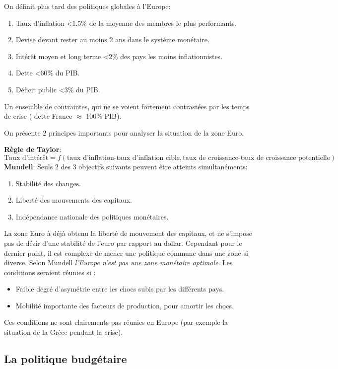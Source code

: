 On définit plus tard des politiques globales à l'Europe: 
\begin{enumerate}
	\item Taux d'inflation <1.5$\%$ de la moyenne des membres le plus performants.
	\item Devise devant rester au moins 2 ans dans le système monétaire.
	\item Intérêt moyen et long terme <$2\%$ des pays les moins inflationnistes.
	\item Dette <$60\%$ du PIB.
	\item Déficit public <$3\%$ du PIB.
	
\end{enumerate}

Un ensemble de contraintes, qui ne se voient fortement contrastées par les temps de crise ( dette France $\approx$ 100$\%$ PIB).

On présente 2 principes importants pour analyser la situation de la zone Euro. 

\textbf{Règle de Taylor}: 	\[
	\text{Taux d'intérêt}= f(\text{taux d'inflation-taux d'inflation cible},\text{taux de croissance-taux de croissance potentielle})
\]
\textbf{Mundell}: Seuls 2 des 3 objectifs suivants peuvent être atteints simultanéments: 
\begin{enumerate}
	\item Stabilité des changes.
	\item Liberté des mouvements des capitaux.
	\item Indépendance nationale des politiques monétaires. 
\end{enumerate}

La zone Euro à déjà obtenu la liberté de mouvement des capitaux, et ne s'impose pas de désir d'une stabilité de l'euro par rapport au dollar. Cependant pour le
dernier point, il est complexe de mener une politique commune dans une zone si diverse. Selon Mundell \emph{l'Europe n'est pas une zone monétaire optimale}.
Les conditions seraient réunies si : 
\begin{itemize}
	\item Faible degré d'asymétrie entre les chocs subis par les différents pays.
	\item Mobilité importante des facteurs de production, pour amortir les chocs. 
\end{itemize}
Ces conditions ne sont clairements pas réunies en Europe (par exemple la situation de la Grèce pendant la crise).
\subsection{La politique budgétaire} %
\label{sub:la_politique_budgetaire}


